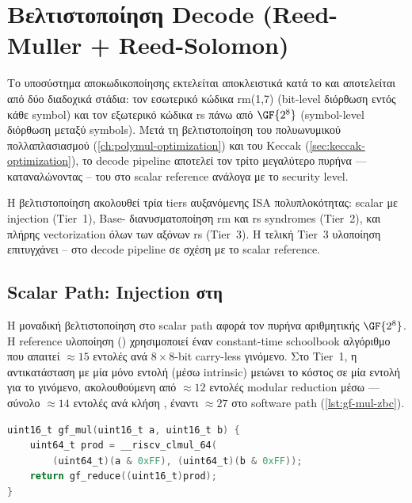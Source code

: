\section{Βελτιστοποίηση Decode (Reed-Muller + Reed-Solomon)}
\label{sec:decode-optimization}

Το υποσύστημα αποκωδικοποίησης εκτελείται αποκλειστικά κατά το \Decaps και
αποτελείται από δύο διαδοχικά στάδια: τον εσωτερικό κώδικα \gls{rm}(1,7)
(bit-level διόρθωση εντός κάθε symbol) και τον εξωτερικό κώδικα \gls{rs}
πάνω από $\GF{2^8}$ (symbol-level διόρθωση μεταξύ symbols).  Μετά τη
βελτιστοποίηση του πολυωνυμικού πολλαπλασιασμού (\cref{ch:polymul-optimization})
και του Keccak (\cref{sec:keccak-optimization}), το decode pipeline αποτελεί
τον τρίτο μεγαλύτερο πυρήνα — καταναλώνοντας – του
\Decaps \instret στο scalar reference ανάλογα με το security level.

Η βελτιστοποίηση ακολουθεί τρία tiers αυξανόμενης ISA
πολυπλοκότητας: scalar με \Zbc injection (Tier~1), Base-\RVV
διανυσματοποίηση \gls{rm} και \gls{rs} syndromes (Tier~2), και πλήρης
\Zvbc vectorization όλων των αξόνων \gls{rs} (Tier~3).  Η τελική Tier~3
υλοποίηση επιτυγχάνει – στο decode pipeline
σε σχέση με το scalar reference.

\subsection{Scalar Path: \Zbc Injection στη }
\label{sec:decode-scalar}

Η μοναδική βελτιστοποίηση στο scalar path αφορά τον πυρήνα αριθμητικής
$\GF{2^8}$.  Η reference υλοποίηση () χρησιμοποιεί
έναν constant-time schoolbook αλγόριθμο που απαιτεί $\approx\num{15}$
εντολές ανά $8 \times 8$-bit carry-less γινόμενο.  Στο Tier~1, η
αντικατάσταση με μία μόνο εντολή \clmul (μέσω \Zbc intrinsic) μειώνει
το κόστος σε μία εντολή για το γινόμενο, ακολουθούμενη από $\approx\num{12}$
εντολές modular reduction μέσω  — σύνολο
$\approx\num{14}$ εντολές ανά κλήση , έναντι
$\approx\num{27}$ στο software path (\cref{lst:gf-mul-zbc}).

\begin{lstlisting}[language=C, caption={Scalar \code{gf\_mul} με \Zbc injection.},
  label={lst:gf-mul-zbc}]
uint16_t gf_mul(uint16_t a, uint16_t b) {
    uint64_t prod = __riscv_clmul_64(
        (uint64_t)(a & 0xFF), (uint64_t)(b & 0xFF));
    return gf_reduce((uint16_t)prod);
}
\end{lstlisting}

